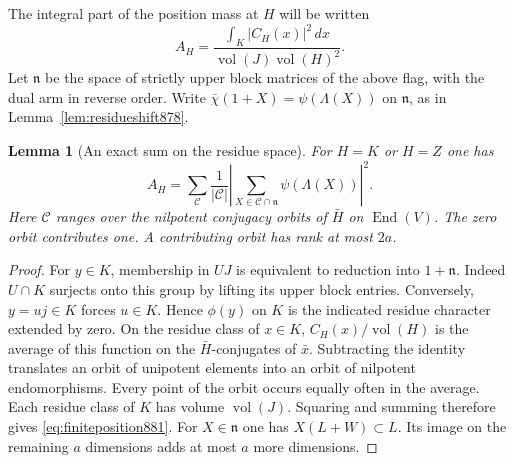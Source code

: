 \documentclass[a4paper,11pt]{article}
\newtheorem{lemma}[proposition]{Lemma}
\theoremstyle{definition}
\theoremstyle{remark}
\numberwithin{equation}{section}
\begin{document}
The integral part of the position mass at \(H\) will be written
\[
 A_H=\frac{\int_K |C_H(x)|^2\,dx}
                  {\operatorname{vol}(J)\operatorname{vol}(H)^2}.
\]
Let \(\mathfrak n\) be the space of strictly upper block matrices
of the above flag, with the dual arm in reverse order. Write
\(\bar\chi(1+X)=\psi(\Lambda(X))\) on \(\mathfrak n\), as in
Lemma~\ref{lem:residueshift878}.

\begin{lemma}[An exact sum on the residue space]
\leavevmode\label{lem:finiteposition881}
For \(H=K\) or \(H=Z\) one has
\begin{equation}
 A_H=\sum_{\mathcal C}
   \frac{1}{|\mathcal C|}
       \left|\sum_{X\in\mathcal C\cap\mathfrak n}
                    \psi(\Lambda(X))\right|^2 .
 \label{eq:finiteposition881}
\end{equation}
Here \(\mathcal C\) ranges over the nilpotent conjugacy orbits of
\(\bar H\) on \(\operatorname{End}(V)\). The zero orbit contributes
one. A contributing orbit has rank at most \(2a\).
\end{lemma}
\begin{proof}
For \(y\in K\), membership in \(UJ\) is equivalent to reduction
into \(1+\mathfrak n\). Indeed \(U\cap K\) surjects onto this group
by lifting its upper block entries. Conversely, \(y=u j\in K\)
forces \(u\in K\). Hence \(\phi(y)\) on \(K\) is the indicated
residue character extended by zero. On the residue class of
\(x\in K\), \(C_H(x)/\operatorname{vol}(H)\) is the average of
this function on the \(\bar H\)-conjugates of \(\bar x\).
Subtracting the identity translates an orbit of unipotent
elements into an orbit of nilpotent endomorphisms. Every point
of the orbit occurs equally often in the average. Each residue
class of \(K\) has volume \(\operatorname{vol}(J)\). Squaring
and summing therefore gives \eqref{eq:finiteposition881}.
For \(X\in\mathfrak n\) one has \(X(L+W)\subset L\). Its image
on the remaining \(a\) dimensions adds at most \(a\) more
dimensions.
\end{proof}
\end{document}
